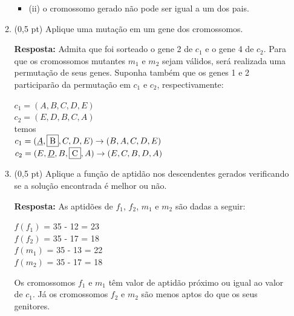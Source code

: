\documentclass[12pt,a4paper,oneside]{article}
\begin{document}
\begin{enumerate}
\begin{enumerate}
{\begin{itemize}
				\item[] (ii) o cromossomo gerado não pode ser igual a um dos pais.
		\end{itemize}}
		\item (0,5 pt) Aplique uma mutação em um gene dos cromossomos.\\
		{\color{blue} {\bf Resposta:} Admita que foi sorteado o gene 2 de $c_1$ e o gene 4 de $c_2$. Para que os cromossomos mutantes $m_1$ e $m_2$ sejam válidos, será realizada uma permutação de seus genes. Suponha também que os genes 1 e 2 participarão da permutação em $c_1$ e $c_2$, respectivamente:
			\begin{center}
				$c_1 = (A,B,C,D,E)$\\
				$c_2 = (E,D,B,C,A)$\\
				temos\\
				$c_1 = (\underline{A},\fbox{B},C,D,E) \rightarrow (B,A,C,D,E)$\\
				$c_2 = (E,\underline{D},B,\fbox{C},A) \rightarrow (E,C,B,D,A)$
		\end{center}}
		\item (0,5 pt) Aplique a função de aptidão nos descendentes gerados verificando se a solução encontrada é melhor ou não.\\
		{\color{blue} {\bf Resposta:} As aptidões de $f_1$, $f_2$, $m_1$ e $m_2$ são dadas a seguir:
			\begin{center}
				$f(f_1)$ 	= 35 - 12 = 23\\
				$f(f_2)$ 	= 35 - 17 = 18\\
				$f(m_1)$ 	= 35 - 13 = 22\\
				$f(m_2)$ 	= 35 - 17 = 18
			\end{center}
			Os cromossomos $f_1$ e $m_1$ têm valor de aptidão próximo ou igual ao valor de $c_1$. Já os cromossomos $f_2$ e $m_2$ são menos aptos do que os seus genitores.}
		\end{enumerate}
\end{enumerate}
\end{document}
